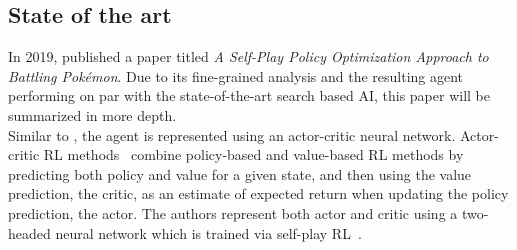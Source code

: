 \subsection{State of the art}
In 2019, \cite{Huang_Lee_2019} published a paper titled \emph{A Self-Play Policy 
Optimization Approach to Battling Pokémon}. 
Due to its fine-grained analysis and the resulting agent performing on par with the state-of-the-art search
based AI, this paper will be summarized in more depth. \\
Similar to \cite{OpenAI_dota}, the agent is represented using an actor-critic neural network.
Actor-critic RL methods~\autocite{Konda_Tsitsiklis}
combine policy-based and value-based RL methods by predicting both policy and value for a given 
state, and then using the value prediction, the \grqq critic\grqq, as an estimate of expected
return when updating the policy prediction, the \grqq actor\grqq. The authors represent both
actor and critic using a two-headed neural network which is trained via self-play RL~\autocite{Huang_Lee_2019}.

